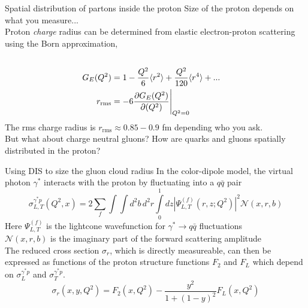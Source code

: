 \documentclass[svgnames]{beamer}
\begin{document}
\begin{frame}{Spatial distribution of partons inside the proton}
Size of the proton depends on what you measure... \bigskip \\
Proton \emph{charge} radius can be determined from elastic electron-proton scattering using the Born approximation,
\begin{align*}
    \cr G_E(Q^2) &= 1 - \frac{Q^2}{6} \langle r^2 \rangle + \frac{Q^2}{120} \langle r^4 \rangle + ... \\
    r_\text{rms} &= -6 \frac{\partial G_E(Q^2)}{\partial (Q^2)} \Bigg\vert_{Q^2=0}
\end{align*}
The rms charge radius is $r_\text{rms} \approx 0.85 -0.9$ fm depending who you ask. \bigskip \\

But what about charge neutral gluons? How are quarks and gluons spatially distributed in the proton?
\end{frame}

\begin{frame}{Using DIS to size the gluon cloud radius}
\bigskip
In the color-dipole model, the virtual photon $\gamma^*$ interacts with the proton by fluctuating into a $q \bar{q}$ pair
\begin{equation*}
    \sigma^{\gamma^* p}_{L,T}(Q^2, x) = 2 \sum\limits_f \int \int d^2b\, d^2r \int\limits_0^1 dz | \Psi^{(f)}_{L,T}(r,z;Q^2)|^2 \mathcal{N}(x,r,b)
\end{equation*}
Here $\Psi^{(f)}_{L,T}$ is the lightcone wavefunction for $\gamma^* \rightarrow q\bar{q}$ fluctuations \\
$\mathcal{N}(x,r,b)$ is the imaginary part of the forward scattering amplitude \bigskip \\

The reduced cross section $\sigma_r$, which is directly measureable, can then be expressed as functions of the proton structure functions $F_2$ and $F_L$ which depend on  $\sigma^{\gamma^* p}_{L}$ and $\sigma^{\gamma^* p}_{T}$.  
\begin{equation*}
    \sigma_r(x,y,Q^2) = F_2(x,Q^2) - \frac{y^2}{1 + (1-y)^2} F_L(x, Q^2)
\end{equation*}

\end{frame}
\end{document}
